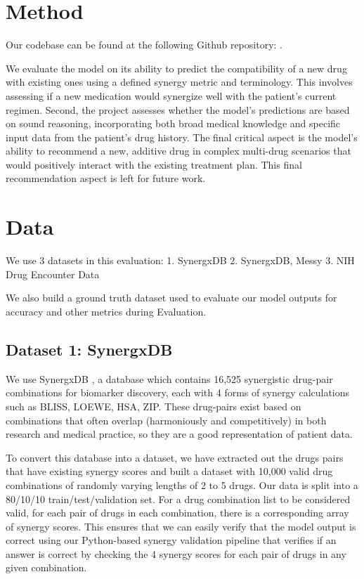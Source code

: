 \documentclass[11pt]{article}
\begin{document}
\section{Method}
Our codebase can be found at the following Github repository: \cite{repo}.

We evaluate the model on its ability to predict the compatibility of a new drug with existing ones using a defined synergy metric and terminology. This involves assessing if a new medication would synergize well with the patient's current regimen. Second, the project assesses whether the model's predictions are based on sound reasoning, incorporating both broad medical knowledge and specific input data from the patient's drug history. The final critical aspect is the model's ability to recommend a new, additive drug in complex multi-drug scenarios that would positively interact with the existing treatment plan. This final recommendation aspect is left for future work.

\section{Data}
We use 3 datasets in this evaluation:  
1. SynergxDB    
2. SynergxDB, Messy   
3. NIH Drug Encounter Data  

We also build a ground truth dataset used to evaluate our model outputs for accuracy and other metrics during Evaluation.

\subsection{Dataset 1: SynergxDB}
We use SynergxDB \cite{Lab2020-mi}, a database which contains 16,525 synergistic drug-pair combinations for biomarker discovery, each with 4 forms of synergy calculations such as BLISS, LOEWE, HSA, ZIP. These drug-pairs exist based on combinations that often overlap (harmoniously and competitively) in both research and medical practice, so they are a good representation of patient data.

To convert this database into a dataset, we have extracted out the drugs pairs that have existing synergy scores and built a dataset with 10,000 valid drug combinations of randomly varying lengths of 2 to 5 drugs. Our data is split into a 80/10/10 train/test/validation set. For a drug combination list to be considered valid, for each pair of drugs in each combination, there is a corresponding array of synergy scores. This ensures that we can easily verify that the model output is correct using our Python-based synergy validation pipeline that verifies if an answer is correct by checking the 4 synergy scores for each pair of drugs in any given combination.
\end{document}
